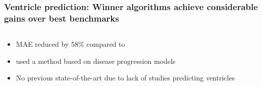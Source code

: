 \documentclass[8pt,xcolor=table,aspectratio=169]{beamer}
\begin{document}
\begin{frame}
\frametitle{\textbf{Ventricle prediction:} Winner algorithms achieve considerable gains over best benchmarks}

\begin{columns}[t]
\begin{column}[t]{0.5\textwidth}
 \begin{itemize}
  \item MAE reduced by 58\% compared to 
  
  \vspace{2em}
  
  \item {} used a method based on disease progression models
  
  \vspace{2em}
  
  \item No previous state-of-the-art due to lack of studies predicting ventricles
\end{itemize}
\end{column}
\begin{column}{0.4\textwidth}


\end{column}
\end{columns}
\end{frame}
\end{document}
